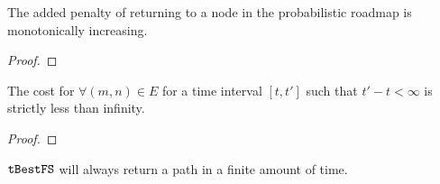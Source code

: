 
\begin{lemma}

    \label{theorem:increasing}

    The added penalty of returning to a node in the probabilistic roadmap is
    monotonically increasing.

\end{lemma}

\begin{proof}



\end{proof}

\begin{lemma}

    \label{theorem:capped}

    The cost for $\forall (m, n) \in E$ for a time interval $[t, t']$ such that
    $t' - t < \infty$ is strictly less than infinity.

\end{lemma}

\begin{proof}



\end{proof}

\begin{theorem}

    \label{theorem:completeness}

    $\Acronym{tBestFS}$ will always return a path in a finite amount of time.

\end{theorem}

